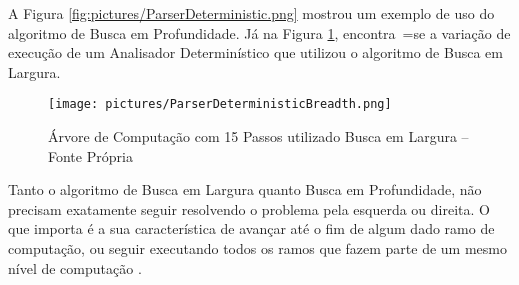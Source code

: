 {    A Figura \ref{fig:pictures/ParserDeterministic.png} mostrou um exemplo de uso do algoritmo de Busca em Profundidade.
    Já na Figura \ref{fig:pictures/ParserDeterministicBreadth.png},
    encontra~=se a variação de execução de um Analisador Determinístico que utilizou o algoritmo de Busca em Largura.
    \begin{figure}[h]
    \centering
    \texttt{[image: pictures/ParserDeterministicBreadth.png]}
    \caption[Árvore de Computação com 15 Passos utilizado Busca em Largura]{Árvore de Computação com 15 Passos utilizado Busca em Largura -- Fonte Própria}
    \label{fig:pictures/ParserDeterministicBreadth.png}
    \end{figure}

    Tanto o algoritmo de Busca em Largura quanto Busca em Profundidade,
    não precisam exatamente seguir resolvendo o problema pela esquerda ou
    direita.
    O que importa é a sua característica de avançar até o fim de algum dado ramo de computação,
    ou seguir executando todos os ramos que fazem parte de um mesmo nível de computação \cite{cormenIntroductionToAlgorithms,efficientBreadthFirstSearch}.
}

